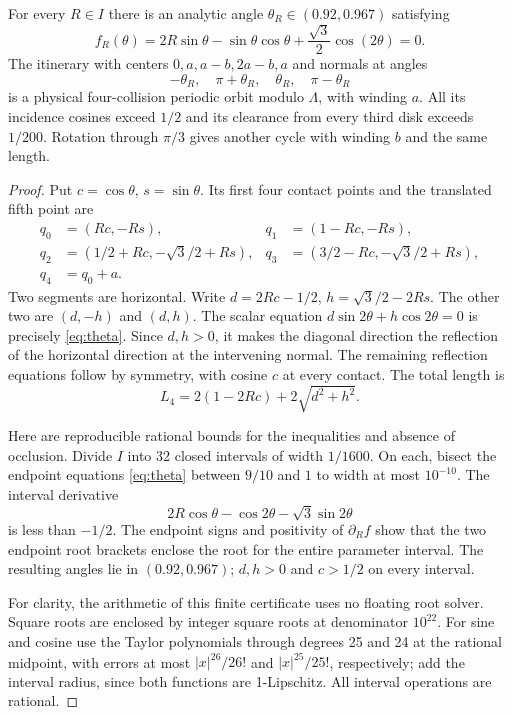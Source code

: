 \begin{lemma}\label{lem:winding}
For every $R\in I$ there is an analytic angle $\theta_R\in(0.92,0.967)$ satisfying
\begin{equation}\label{eq:theta}
 f_R(\theta)=2R\sin\theta-\sin\theta\cos\theta
                       +\frac{\sqrt3}{2}\cos(2\theta)=0.
\end{equation}
The itinerary with centers $0,a,a-b,2a-b,a$ and normals at angles
\[
 -\theta_R,\quad\pi+\theta_R,\quad\theta_R,\quad\pi-\theta_R
\]
is a physical four-collision periodic orbit modulo $\Lambda$, with winding $a$. All its incidence cosines exceed $1/2$ and its clearance from every third disk exceeds $1/200$. Rotation through $\pi/3$ gives another cycle with winding $b$ and the same length.
\end{lemma}
\begin{proof}
Put $c=\cos\theta$, $s=\sin\theta$. Its first four contact points and the translated fifth point are
\begin{align*}
 q_0&=(Rc,-Rs),&q_1&=(1-Rc,-Rs),\\
 q_2&=(1/2+Rc,-\sqrt3/2+Rs),&q_3&=(3/2-Rc,-\sqrt3/2+Rs),\\
 q_4&=q_0+a.
\end{align*}
Two segments are horizontal. Write $d=2Rc-1/2$, $h=\sqrt3/2-2Rs$. The other two are $(d,-h)$ and $(d,h)$. The scalar equation $d\sin2\theta+h\cos2\theta=0$ is precisely \eqref{eq:theta}. Since $d,h>0$, it makes the diagonal direction the reflection of the horizontal direction at the intervening normal. The remaining reflection equations follow by symmetry, with cosine $c$ at every contact. The total length is
\begin{equation}\label{eq:fourlength}
 L_4=2(1-2Rc)+2\sqrt{d^2+h^2}.
\end{equation}

Here are reproducible rational bounds for the inequalities and absence of occlusion. Divide $I$ into 32 closed intervals of width $1/1600$. On each, bisect the endpoint equations \eqref{eq:theta} between $9/10$ and $1$ to width at most $10^{-10}$. The interval derivative
\[
 2R\cos\theta-\cos2\theta-\sqrt3\sin2\theta
\]
is less than $-1/2$. The endpoint signs and positivity of $\partial_R f$ show that the two endpoint root brackets enclose the root for the entire parameter interval. The resulting angles lie in $(0.92,0.967)$; $d,h>0$ and $c>1/2$ on every interval.

For clarity, the arithmetic of this finite certificate uses no floating root solver. Square roots are enclosed by integer square roots at denominator $10^{22}$. For sine and cosine use the Taylor polynomials through degrees 25 and 24 at the rational midpoint, with errors at most $|x|^{26}/26!$ and $|x|^{25}/25!$, respectively; add the interval radius, since both functions are 1-Lipschitz. All interval operations are rational.


\end{proof}
